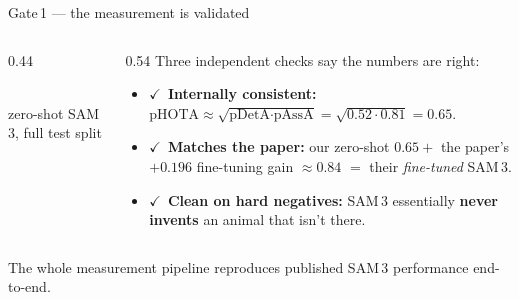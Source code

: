 \documentclass[aspectratio=169,11pt]{beamer}
\newcommand{\ck}{{\color{forest}$\checkmark$}}
\begin{document}
\begin{frame}{Gate\,1 --- the measurement is validated}
  \begin{columns}[T]
    \begin{column}{0.44\textwidth}
      \centering
      \\[-2pt]
      {\scriptsize zero-shot SAM\,3, full test split}
    \end{column}
    \begin{column}{0.54\textwidth}
      \footnotesize Three independent checks say the numbers are right:
      \begin{itemize}\footnotesize
        \item \ck\ \textbf{Internally consistent:} $\text{pHOTA}\approx\sqrt{\text{pDetA}\cdot\text{pAssA}}
              =\sqrt{0.52\cdot0.81}=0.65$.
        \item \ck\ \textbf{Matches the paper:} our zero-shot $0.65 + $ the paper's $+0.196$ fine-tuning gain
              $\approx 0.84$ $=$ their \emph{fine-tuned} SAM\,3.
        \item \ck\ \textbf{Clean on hard negatives:} SAM\,3 essentially \textbf{never invents} an animal
              that isn't there.
      \end{itemize}
    \end{column}
  \end{columns}
  \vspace{0.2em}
  \centering\footnotesize The whole measurement pipeline reproduces published SAM\,3 performance end-to-end.
\end{frame}
\end{document}
